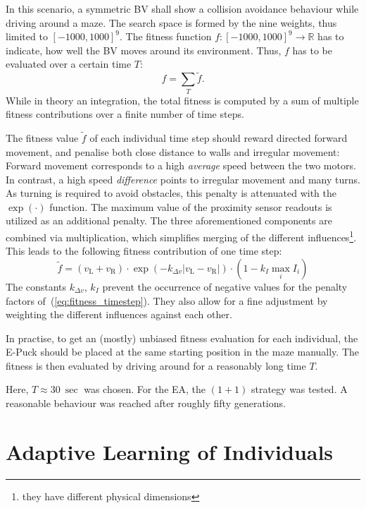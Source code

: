 \documentclass[a4paper]{jacow}
\begin{document}
In this scenario, a symmetric BV shall show a collision avoidance behaviour while driving around a maze. The search space is formed by the nine weights, thus limited to $[-1000,1000]^9$. The fitness function \mbox{$f:[-1000,1000]^9\to \mathbb{R}$} has to indicate, how well the BV moves around its environment. Thus, $f$ has to be evaluated over a certain time $T$:
\begin{equation}
	f = \sum\limits_T \tilde{f}.
\end{equation}
While in theory an integration, the total fitness is computed by a sum of multiple fitness contributions over a finite number of time steps. 

The fitness value $\tilde{f}$ of each individual time step should reward directed forward movement, and penalise both close distance to walls and irregular movement: Forward movement corresponds to a high \emph{average} speed between the two motors. In contrast, a high speed \emph{difference} points to irregular movement and many turns. As turning is required to avoid obstacles, this penalty is attenuated with the $\exp(\cdot)$ function. The maximum value of the proximity sensor readouts is utilized as an additional penalty. The three aforementioned components are combined via multiplication, which simplifies merging of the different influences\footnote{they have different physical dimensions}. This leads to the following fitness contribution of one time step:
\begin{equation}
	\tilde{f} = \left( v_\mathrm{L} + v_\mathrm{R} \right) \cdot \exp\left( - k_{\Delta v}|v_\mathrm{L}-v_\mathrm{R}| \right) \cdot \left(1- k_{I} \max\limits_i I_i\right)
	\label{eq:fitness_timestep} 
\end{equation}
The constants $k_{\Delta v}$, $k_I$ prevent the occurrence of negative values for the penalty factors of~(\ref{eq:fitness_timestep}). They also allow for a fine adjustment by weighting the different influences against each other.

In practise, to get an (mostly) unbiased fitness evaluation for each individual, the E-Puck should be placed at the same starting position in the maze manually. The fitness is then evaluated by driving around for a reasonably long time $T$. 

Here, $T\approx\SI{30}{\sec}$ was chosen. For the EA, the $(1+1)$ strategy was tested. A reasonable behaviour was reached after roughly fifty generations.


\section{Adaptive Learning of Individuals}
\end{document}
